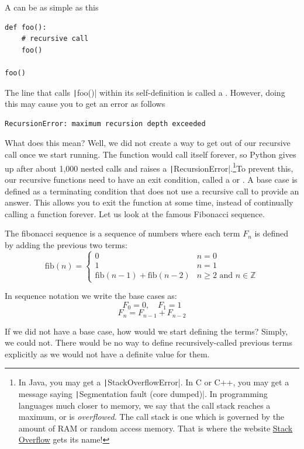A  can be as simple as this
\begin{verbatim}
def foo():
    # recursive call
    foo()

foo()
\end{verbatim}
The line that calls \texttt|foo()| within its self-definition is called a .
However, doing this may cause you to get an error as follows
\begin{verbatim}
RecursionError: maximum recursion depth exceeded
\end{verbatim}
What does this mean? Well, we did not create a way to get out of our recursive call once we start running. The function would call itself forever, so Python gives up after about 1,000 nested calls and raises a \texttt|RecursionError|.\footnote{In Java, you may get a \texttt|StackOverflowError|. In C or C++, you may get a message saying \texttt|Segmentation fault (core dumped)|. In programming languages much closer to memory, we say that the call stack reaches a maximum, or is \textit{overflowed}. The call stack is one which is governed by the amount of RAM or random access memory. That is where the website \href{https://stackoverflow.com/questions}{Stack Overflow} gets its name!}To prevent this, our recursive functions need to have an exit condition, called a  or .
A base case is defined as a terminating condition that does not use a recursive call to provide an answer. This allows you to exit the function at some time, instead of continually calling a function forever. Let us look at the famous Fibonacci sequence.

The fibonacci sequence is a sequence of numbers where each term $F_n$ is defined by adding the previous two terms:
\begin{equation*}
  \mathrm{fib}(n) = \begin{cases}
    0 & n=0\\
    1 & n=1\\
    \mathrm{fib}(n-1)+\mathrm{fib}(n-2)& n \ge 2 \text{ and } n \in \mathbb{Z}
  \end{cases}
\end{equation*}

In sequence notation we write the base cases as:
$$F_0 = 0, \quad F_1=1$$
$$F_n = F_{n-1} + F_{n-2}$$

If we did not have a base case, how would we start defining the terms? Simply, we could not. There would be no way to define recursively-called previous terms explicitly as we would not have a definite value for them.


